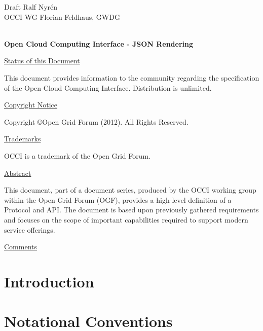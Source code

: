\documentclass[10pt,a4paper]{article}
\begin{document}
\thispagestyle{empty}

Draft \hfill Ralf Nyrén \\
OCCI-WG \hfill Florian Feldhaus, GWDG\\
\\

\vspace*{0.5in}

\begin{Large}
\textbf{Open Cloud Computing Interface - JSON Rendering}
\end{Large}

\vspace*{0.5in}

\underline{Status of this Document}

This document provides information to the community regarding the
specification of the Open Cloud Computing Interface. Distribution is
unlimited.

\underline{Copyright Notice}

Copyright \copyright Open Grid Forum (2012). All Rights Reserved.

\underline{Trademarks}

OCCI is a trademark of the Open Grid Forum.

\underline{Abstract}

This document, part of a document series, produced by the OCCI working
group within the Open Grid Forum (OGF), provides a high-level
definition of a Protocol and API. The document is based upon
previously gathered requirements and focuses on the scope of important
capabilities required to support modern service offerings.

\underline{Comments}
\newcommand{\ralf}[1]{\textcolor{red}{RN: #1}}
\newcommand{\andy}[1]{\textcolor{green}{AE: #1}}
\newcommand{\florian}[1]{\textcolor{blue}{FF: #1}}

\newpage
\tableofcontents
\newpage

\section{Introduction}


\section{Notational Conventions}

\end{document}
